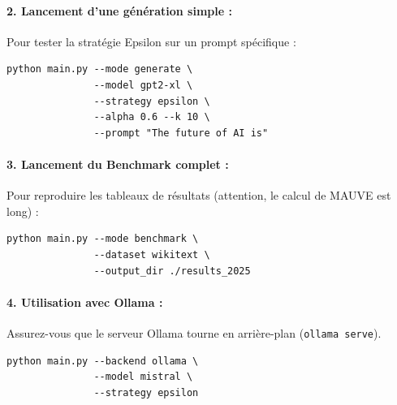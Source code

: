 \documentclass[12pt,a4paper]{article}
\begin{document}
\paragraph{2. Lancement d'une g\'en\'eration simple :}
Pour tester la strat\'egie Epsilon sur un prompt sp\'ecifique :
\begin{verbatim}
python main.py --mode generate \
               --model gpt2-xl \
               --strategy epsilon \
               --alpha 0.6 --k 10 \
               --prompt "The future of AI is"
\end{verbatim}

\paragraph{3. Lancement du Benchmark complet :}
Pour reproduire les tableaux de r\'esultats (attention, le calcul de MAUVE est long) :
\begin{verbatim}
python main.py --mode benchmark \
               --dataset wikitext \
               --output_dir ./results_2025
\end{verbatim}

\paragraph{4. Utilisation avec Ollama :}
Assurez-vous que le serveur Ollama tourne en arri\`ere-plan (\texttt{ollama serve}).
\begin{verbatim}
python main.py --backend ollama \
               --model mistral \
               --strategy epsilon
\end{verbatim}
\end{document}
